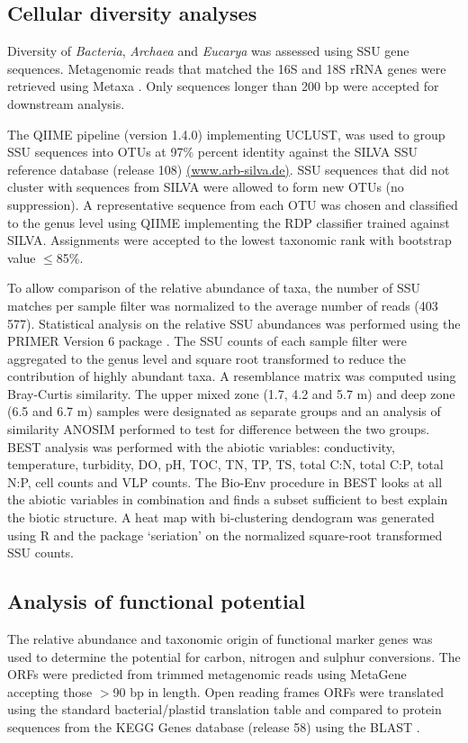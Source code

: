 \subsection{Cellular diversity analyses}
Diversity of \emph{Bacteria}, \emph{Archaea} and \emph{Eucarya} was assessed using \ac{SSU} gene sequences. 
Metagenomic reads that matched the 16S and 18S \ac{rRNA} genes were retrieved using Metaxa \cite{Bengtsson2011}. 
Only sequences longer than 200 bp were accepted for downstream analysis. 

The \ac{QIIME} pipeline (version 1.4.0) \cite{Caporaso2010} implementing \textsc{UCLUST}, was used to group \ac{SSU} sequences into \acp{OTU} at 97\% percent identity against the SILVA \ac{SSU} reference database (release 108)
\url{(www.arb-silva.de)}. 
\ac{SSU} sequences that did not cluster with sequences from SILVA were allowed to form new \acp{OTU} (no suppression). 
A representative sequence from each \ac{OTU} was chosen and classified to the genus level using \ac{QIIME} implementing the \ac{RDP} classifier \cite{Wang2007} trained against SILVA. 
Assignments were accepted to the lowest taxonomic rank with bootstrap value $\leq$85\%. 

To allow comparison of the relative abundance of taxa, the number of \ac{SSU} matches per sample filter was normalized to the average number of reads (403 577). 
Statistical analysis on the relative \ac{SSU} abundances was performed using the PRIMER Version 6 package \cite{Clarke2006}. 
The \ac{SSU} counts of each sample filter were aggregated to the genus level and square root transformed to reduce the contribution of highly abundant taxa. 
A resemblance matrix was computed using Bray-Curtis similarity. 
The upper mixed zone (1.7, 4.2 and 5.7 m) and deep zone (6.5 and 6.7 m) samples were designated as separate groups and an analysis of similarity \ac{ANOSIM} performed to test for difference between the two groups. 
BEST analysis was performed with the abiotic variables: conductivity, temperature, turbidity, \ac{DO}, pH, \ac{TOC}, \ac{TN}, \ac{TP}, \ac{TS}, total C:N, total C:P, total N:P, cell counts and \ac{VLP} counts. 
The Bio-Env procedure in BEST looks at all the abiotic variables in combination and finds a subset sufficient to best explain the biotic structure. 
A heat map with bi-clustering dendogram was generated using R and the package ‘seriation’ \cite{Hahsler2008} on the normalized square-root transformed \ac{SSU} counts.

\subsection{Analysis of functional potential}
The relative abundance and taxonomic origin of functional marker genes was used to determine the potential for carbon, nitrogen and sulphur conversions.
The \acp{ORF} were predicted from trimmed metagenomic reads using MetaGene \cite{Noguchi2006} accepting those $>$90 bp in length. 
Open reading frames \acsp{ORF} were translated using the standard bacterial/plastid translation table and compared to protein sequences from the \ac{KEGG} Genes database (release 58) using the \ac{BLAST} \cite{Altschul1990}. 

